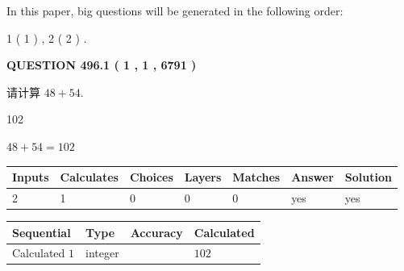 \documentclass{ctexart}
\begin{document}
   
   
\vspace{0.2in}
   
In this paper, big questions will be generated in the following order: 
   
   
   1 ( 1 )
 ,
   2 ( 2 )
 .
  
\vspace{0.2in}
  
{\textbf{\Large{QUESTION
496.1 
 ( 1 , 1 , 6791 )
}}}
  
  
 
请计算 $ %
48 +  %
54 $.
 
 
 
\noindent{}
 
 

102
 
 
\noindent{}
 
 

 
 
 
\noindent{}
 
 

$ %
48 +  %
54=   %
102$
 
 
\noindent{}
 
 

 
   
   
   
   
\noindent\begin{tabular}{|l|l|l|l|l|l|l|}
 \hline
Inputs & Calculates & Choices & Layers & Matches & Answer & Solution \\ \hline
 2  & 
 1  & 
 0
  & 
 0  & 
 0  & 
  yes & 
  yes 
  \\ \hline
 \end{tabular}
   
   
   
   
\noindent{}
   
   
  
  
\noindent\begin{tabular}{|l|l|l|l|}
\hline
 Sequential & Type & Accuracy & Calculated \\ 
\hline
 
 
  Calculated $  1 $ & integer &  & 
  $ 102 $ 
 \\  \hline  
 \end{tabular}
   
\end{document}
